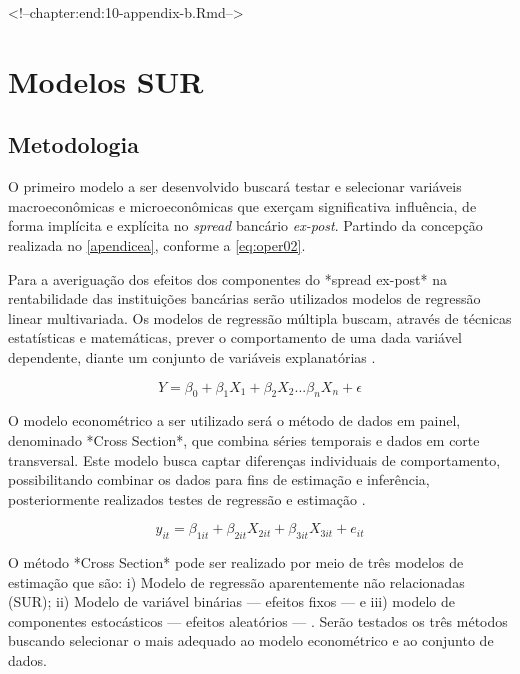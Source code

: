 \documentclass[
  12pt,
  12pt,
  openright,
  oneside,
  a4paper,
  chapter=TITLE,
  section=TITLE,
  subsection=TITLE,
  subsubsection=TITLE,
  english,
  portugues,
  sumario=tradicional]{abntex2}
\begin{document}
\begin{apendicesenv}
<!--chapter:end:10-appendix-b.Rmd-->

\chapter{Modelos SUR}\label{apendicec}

\section{Metodologia}

O primeiro modelo a ser desenvolvido buscará testar e selecionar variáveis macroeconômicas e microeconômicas que exerçam significativa influência, de forma implícita e explícita no \emph{spread} bancário \emph{ex-post}. Partindo da concepção realizada no \autoref{apendicea}, conforme a \autoref{eq:oper02}.

Para a averiguação dos efeitos dos componentes do *spread ex-post* na rentabilidade das instituições bancárias serão utilizados modelos de regressão linear multivariada. Os modelos de regressão múltipla buscam, através de técnicas estatísticas e matemáticas, prever o comportamento de uma dada variável dependente, diante um conjunto de variáveis explanatórias \cite{hill:2010} \cite{gareth:2017}. 

\begin{equation}
Y = \beta_0 + \beta_1X_1 + \beta_2X_2...\beta_nX_n + \epsilon
\end{equation}

O modelo econométrico a ser utilizado será o método de dados em painel, denominado *Cross Section*, que combina séries temporais e dados em corte transversal. Este modelo busca captar diferenças individuais de comportamento, possibilitando combinar os dados para fins de estimação e inferência, posteriormente realizados testes de regressão e estimação \cite{hill:2010}.

\begin{equation}
y_{it} = \beta_{1it} + \beta_{2it}X_{2it} + \beta_{3it}X_{3it} + e_{it}
\end{equation}

O método *Cross Section* pode ser realizado por meio de três modelos de estimação que são: i) Modelo de regressão aparentemente não relacionadas (SUR); ii) Modelo de variável binárias — efeitos fixos — e iii) modelo de componentes estocásticos — efeitos aleatórios — \cite{hill:2010}. Serão testados os três métodos buscando selecionar o mais adequado ao modelo econométrico e ao conjunto de dados.


\end{apendicesenv}
\end{document}
